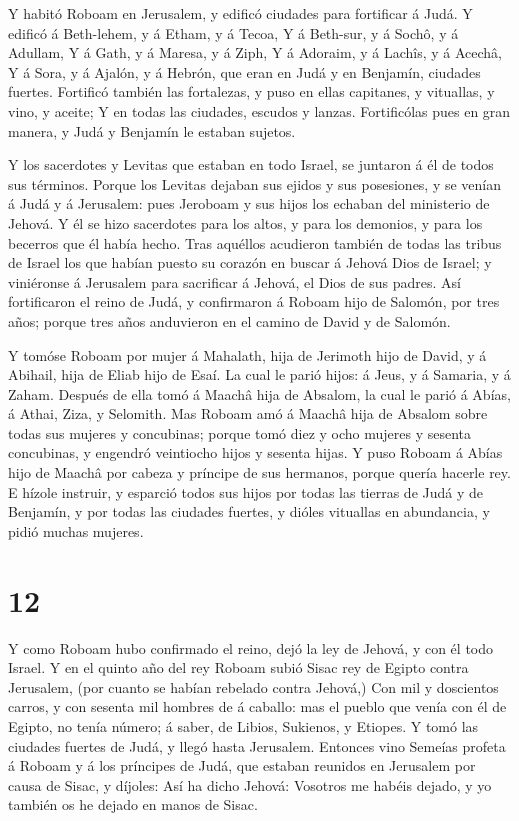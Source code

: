  Y habitó Roboam en Jerusalem, y edificó ciudades para
fortificar á Judá.  Y edificó á Beth-lehem, y á Etham, y á
Tecoa,  Y á Beth-sur, y á Sochô, y á Adullam,  Y
á Gath, y á Maresa, y á Ziph,  Y á Adoraim, y á Lachîs, y á
Acechâ,  Y á Sora, y á Ajalón, y á Hebrón, que eran en Judá
y en Benjamín, ciudades fuertes.  Fortificó también las
fortalezas, y puso en ellas capitanes, y vituallas, y vino, y aceite;
 Y en todas las ciudades, escudos y lanzas. Fortificólas
pues en gran manera, y Judá y Benjamín le estaban sujetos.

 Y los sacerdotes y Levitas que estaban en todo Israel, se
juntaron á él de todos sus términos.  Porque los Levitas
dejaban sus ejidos y sus posesiones, y se venían á Judá y á Jerusalem:
pues Jeroboam y sus hijos los echaban del ministerio de Jehová.
 Y él se hizo sacerdotes para los altos, y para los
demonios, y para los becerros que él había hecho.  Tras
aquéllos acudieron también de todas las tribus de Israel los que habían
puesto su corazón en buscar á Jehová Dios de Israel; y viniéronse á
Jerusalem para sacrificar á Jehová, el Dios de sus padres. 
Así fortificaron el reino de Judá, y confirmaron á Roboam hijo de
Salomón, por tres años; porque tres años anduvieron en el camino de
David y de Salomón.

 Y tomóse Roboam por mujer á Mahalath, hija de Jerimoth
hijo de David, y á Abihail, hija de Eliab hijo de Esaí.  La
cual le parió hijos: á Jeus, y á Samaria, y á Zaham. 
Después de ella tomó á Maachâ hija de Absalom, la cual le parió á Abías,
á Athai, Ziza, y Selomith.  Mas Roboam amó á Maachâ hija de
Absalom sobre todas sus mujeres y concubinas; porque tomó diez y ocho
mujeres y sesenta concubinas, y engendró veintiocho hijos y sesenta
hijas.  Y puso Roboam á Abías hijo de Maachâ por cabeza y
príncipe de sus hermanos, porque quería hacerle rey.  E
hízole instruir, y esparció todos sus hijos por todas las tierras de
Judá y de Benjamín, y por todas las ciudades fuertes, y dióles vituallas
en abundancia, y pidió muchas mujeres.

\hypertarget{section-11}{%
\section{12}\label{section-11}}

 Y como Roboam hubo confirmado el reino, dejó la ley de
Jehová, y con él todo Israel.  Y en el quinto año del rey
Roboam subió Sisac rey de Egipto contra Jerusalem, (por cuanto se habían
rebelado contra Jehová,)  Con mil y doscientos carros, y con
sesenta mil hombres de á caballo: mas el pueblo que venía con él de
Egipto, no tenía número; á saber, de Libios, Sukienos, y Etiopes.
 Y tomó las ciudades fuertes de Judá, y llegó hasta
Jerusalem.  Entonces vino Semeías profeta á Roboam y á los
príncipes de Judá, que estaban reunidos en Jerusalem por causa de Sisac,
y díjoles: Así ha dicho Jehová: Vosotros me habéis dejado, y yo también
os he dejado en manos de Sisac.

